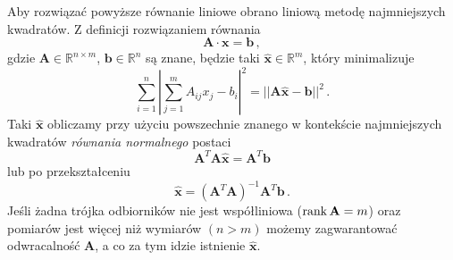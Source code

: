 Aby rozwiązać powyższe równanie liniowe obrano liniową metodę najmniejszych kwadratów. Z definicji rozwiązaniem równania
\begin{equation}
    \mathbf{A} \cdot \mathbf{x} = \mathbf{b}\,,
\end{equation}
gdzie $\mathbf{A} \in \mathbb{R}^{n\times m}$, $\mathbf{b} \in \mathbb{R}^n$ są znane, będzie taki $\hat{\mathbf{x}} \in \mathbb{R}^m$, który minimalizuje
\begin{equation}
    \sum_{i=1}^{n}{\left|\sum_{j=1}^{m}{A_{ij}x_j} - b_i\right|^2} = ||\mathbf{A}\hat{\mathbf{x}} - \mathbf{b}||^2\,.
\end{equation}
Taki $\hat{\mathbf{x}}$ obliczamy przy użyciu powszechnie znanego w kontekście najmniejszych kwadratów \textit{równania normalnego} postaci
\begin{equation}
    \mathbf{A}^T\mathbf{A}\hat{\mathbf{x}} = \mathbf{A}^T\mathbf{b}
\end{equation}
lub po przekształceniu
\begin{equation}\label{eq:lls}
    \hat{\mathbf{x}} = {\left(\mathbf{A}^T\mathbf{A}\right)}^{-1}\mathbf{A}^T\mathbf{b}\,.
\end{equation}
Jeśli żadna trójka odbiorników nie jest współliniowa ($\operatorname{rank}\mathbf{A} = m$) oraz pomiarów jest więcej niż wymiarów $(n > m)$ możemy zagwarantować odwracalność $\mathbf{A}$, a co za tym idzie istnienie $\hat{\mathbf{x}}$.

